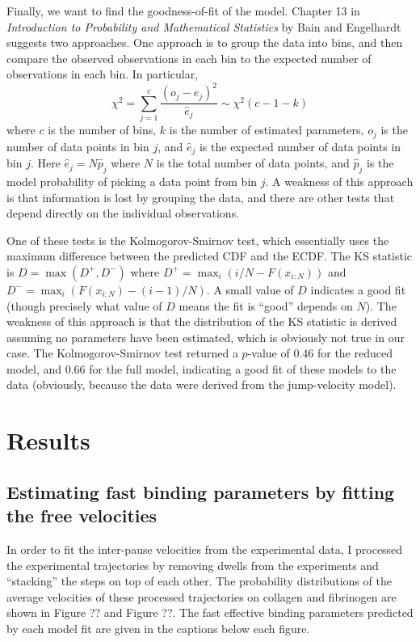 Finally, we want to find the goodness-of-fit of the model. Chapter 13
in \textit{Introduction to Probability and Mathematical Statistics} by
Bain and Engelhardt suggests two approaches. One approach is to group
the data into bins, and then compare the observed observations in each
bin to the expected number of observations in each bin. In particular,
\begin{equation}
  \label{eq:chi2}
  \chi^2 = \sum_{j=1}^c \frac{(o_j - \hat{e}_j)^2}{\hat{e}_j} \sim
  \chi^2(c - 1 - k)
\end{equation}
where $c$ is the number of bins, $k$ is the number of estimated
parameters, $o_j$ is the number of data points in bin $j$, and
$\hat{e}_j$ is the expected number of data points in bin $j$. Here
$\hat{e}_j = N \hat{p}_j$ where $N$ is the total number of data
points, and $\hat{p}_j$ is the model probability of picking a data
point from bin $j$. A weakness of this approach is that information is
lost by grouping the data, and there are other tests that depend
directly on the individual observations.

One of these tests is the Kolmogorov-Smirnov test, which essentially
uses the maximum difference between the predicted CDF and the
ECDF. The KS statistic is $D = \max(D^+, D^-)$ where
$D^+ = \max_i(i/N - F(x_{i:N}))$ and
$D^- = \max_i(F(x_{i:N}) - (i - 1)/N)$. A small value of $D$ indicates
a good fit (though precisely what value of $D$ means the fit is
``good'' depends on $N$). The weakness of this approach is that the
distribution of the KS statistic is derived assuming no parameters
have been estimated, which is obviously not true in our case. The
Kolmogorov-Smirnov test returned a $p$-value of 0.46 for the reduced
model, and 0.66 for the full model, indicating a good fit of these
models to the data (obviously, because the data were derived from the
jump-velocity model).

\section{Results}
\label{sec:results-jump-velocity}

\subsection{Estimating fast binding parameters by fitting the free
  velocities}
\label{sec:estim-fast-bind}

In order to fit the inter-pause velocities from the experimental data,
I processed the experimental trajectories by removing dwells from the
experiments and ``stacking'' the steps on top of each other. The
probability distributions of the average velocities of these processed
trajectories on collagen and fibrinogen are shown in Figure ?? and
Figure ??. The fast effective binding parameters predicted by each
model fit are given in the captions below each figure.

